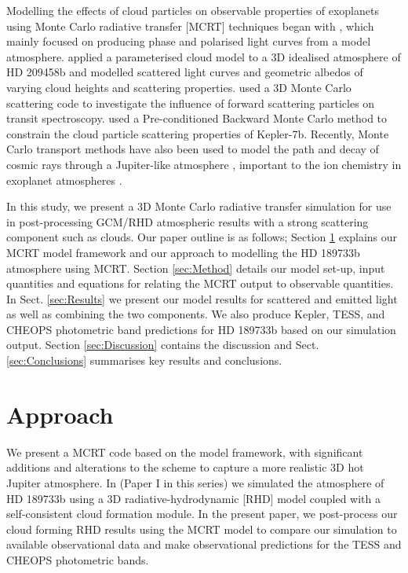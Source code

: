 \documentclass{aa}
\begin{document}
Modelling the effects of cloud particles on observable properties of exoplanets using Monte Carlo radiative transfer [MCRT] techniques began with \citet{Seager2000b}, which mainly focused on producing phase and polarised light curves from a model atmosphere.
\citet{Hood2008} applied a parameterised cloud model to a 3D idealised atmosphere of HD 209458b and modelled scattered light curves and geometric albedos of varying cloud heights and scattering properties.
\citet{deKok2012} used a 3D Monte Carlo scattering code to investigate the influence of forward scattering particles on transit spectroscopy.
\citet{Munoz2015} used a Pre-conditioned Backward Monte Carlo method to constrain the cloud particle scattering properties of Kepler-7b.
Recently, Monte Carlo transport methods have also been used to model the path and decay of cosmic rays through a Jupiter-like atmosphere \citep{Helling2016b}, important to the ion chemistry in exoplanet atmospheres \citep{Rimmer2016}.

In this study, we present a 3D Monte Carlo radiative transfer simulation for use in post-processing GCM/RHD atmospheric results with a strong scattering component such as clouds.
Our paper outline is as follows;
Section \ref{sec:Approach} explains our MCRT model framework and our approach to modelling the HD 189733b atmosphere using MCRT.
Section \ref{sec:Method} details our model set-up, input quantities and equations for relating the MCRT output to observable quantities.
In Sect. \ref{sec:Results} we present our model results for scattered and emitted light as well as combining the two components.
We also produce Kepler, TESS, and CHEOPS photometric band predictions for HD 189733b based on our simulation output.
Section \ref{sec:Discussion} contains the discussion and Sect. \ref{sec:Conclusions} summarises key results and conclusions. 

\section{Approach}
\label{sec:Approach}

We present a MCRT code based on the \citet{Hood2008} model framework, with significant additions and alterations to the scheme to capture a more realistic 3D hot Jupiter atmosphere.
In \citet{Lee2016} (Paper I in this series) we simulated the atmosphere of HD 189733b using a 3D radiative-hydrodynamic [RHD] model coupled with a self-consistent cloud formation module.
In the present paper, we post-process our cloud forming RHD results using the MCRT model to compare our simulation to available observational data and make observational predictions for the TESS and CHEOPS photometric bands.
\end{document}
